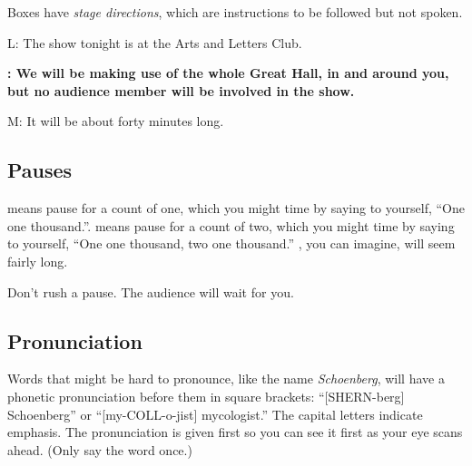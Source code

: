 Boxes have \textit{stage directions}, which are instructions to be followed but not spoken.


\vspace{0.5\baselineskip}
\vspace{0.5\baselineskip}





L:  The show tonight is at the Arts and Letters Club. 

\textbf{\performerletter{\speaker}:  We will be making use of the whole Great Hall, in and around you, but no audience member will be involved in the show.}

M:  It will be about forty minutes long.

\subsection*{Pauses}

 means pause for a count of one, which you might time by saying to yourself, ``One one thousand.''.   means pause for a count of two, which you might time by saying to yourself, ``One one thousand, two one thousand.''  , you can imagine, will seem fairly long.

Don't rush a pause.  The audience will wait for you.

\subsection*{Pronunciation}

Words that might be hard to pronounce, like the name \textit{Schoenberg}, will have a phonetic pronunciation before them in square brackets: ``[SHERN-berg] Schoenberg'' or ``[my-COLL-o-jist] mycologist.''  The capital letters indicate emphasis.  The pronunciation is given first so you can see it first as your eye scans ahead.  (Only say the word once.)

